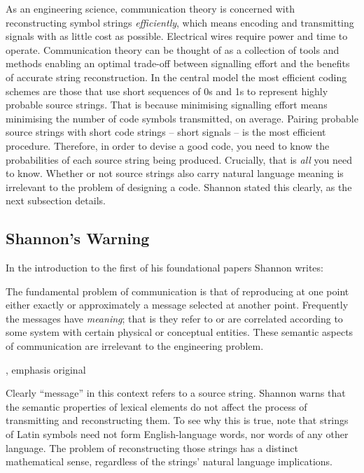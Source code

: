 \documentclass[12pt]{article}
\begin{document}
As an engineering science, communication theory is concerned with reconstructing symbol strings \textit{efficiently}, which means encoding and transmitting signals with as little cost as possible.
Electrical wires require power and time to operate.
Communication theory can be thought of as a collection of tools and methods enabling an optimal trade-off between signalling effort and the benefits of accurate string reconstruction.
In the central model the most efficient coding schemes are those that use short sequences of 0s and 1s to represent highly probable source strings.
That is because minimising signalling effort means minimising the number of code symbols transmitted, on average.
Pairing probable source strings with short code strings -- short signals -- is the most efficient procedure.
Therefore, in order to devise a good code, you need to know the probabilities of each source string being produced.
Crucially, that is \textit{all} you need to know.
Whether or not source strings also carry natural language meaning is irrelevant to the problem of designing a code.
Shannon stated this clearly, as the next subsection details.


\subsection{Shannon's Warning}\label{subsec:warning}

In the introduction to the first of his foundational papers Shannon writes:

\begin{myquote}
The fundamental problem of communication is that of reproducing at one point either exactly or approximately a message selected at another point. Frequently the messages have \emph{meaning}; that is they refer to or are correlated according to some system with certain physical or conceptual entities. These semantic aspects of communication are irrelevant to the engineering problem.
\par\hspace*{\fill}\citet[379]{shannon1948mathematicalc}, emphasis original
\end{myquote}

\noindent Clearly ``message'' in this context refers to a source string.
Shannon warns that the semantic properties of lexical elements do not affect the process of transmitting and reconstructing them.
To see why this is true, note that strings of Latin symbols need not form English-language words, nor words of any other language.
The problem of reconstructing those strings has a distinct mathematical sense, regardless of the strings' natural language implications.
\end{document}
